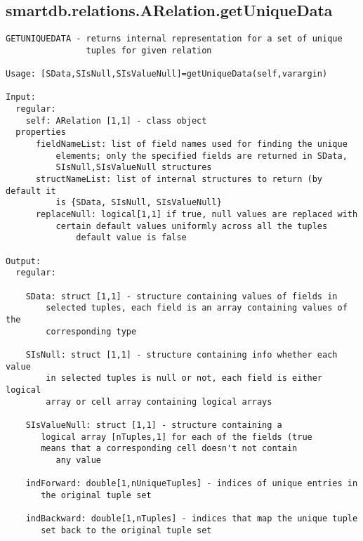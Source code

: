 \subsection{\texorpdfstring{smartdb.relations.ARelation.getUniqueData}{getUniqueData}}\label{method:smartdb.relations.ARelation.getUniqueData}
\begin{verbatim}
GETUNIQUEDATA - returns internal representation for a set of unique
                tuples for given relation

Usage: [SData,SIsNull,SIsValueNull]=getUniqueData(self,varargin)

Input:
  regular:
    self: ARelation [1,1] - class object
  properties
      fieldNameList: list of field names used for finding the unique
          elements; only the specified fields are returned in SData,
          SIsNull,SIsValueNull structures
      structNameList: list of internal structures to return (by default it
          is {SData, SIsNull, SIsValueNull}
      replaceNull: logical[1,1] if true, null values are replaced with
          certain default values uniformly across all the tuples
              default value is false

Output:
  regular:

    SData: struct [1,1] - structure containing values of fields in
        selected tuples, each field is an array containing values of the
        corresponding type

    SIsNull: struct [1,1] - structure containing info whether each value
        in selected tuples is null or not, each field is either logical
        array or cell array containing logical arrays

    SIsValueNull: struct [1,1] - structure containing a
       logical array [nTuples,1] for each of the fields (true
       means that a corresponding cell doesn't not contain
          any value

    indForward: double[1,nUniqueTuples] - indices of unique entries in
       the original tuple set

    indBackward: double[1,nTuples] - indices that map the unique tuple
       set back to the original tuple set
\end{verbatim}
